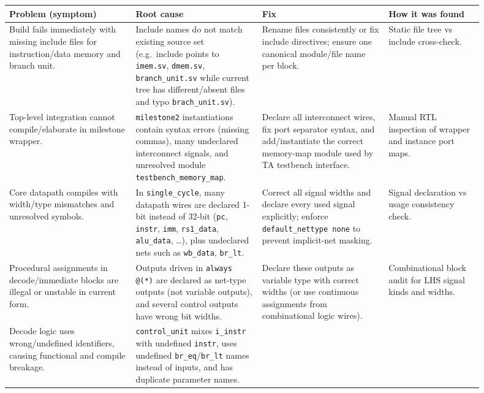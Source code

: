 \documentclass[10pt,a4paper]{article}
\begin{document}
\begin{center}
\small
\begin{tabular}{@{}p{0.24\linewidth}p{0.24\linewidth}p{0.24\linewidth}p{0.18\linewidth}@{}}
\toprule
\textbf{Problem (symptom)} & \textbf{Root cause} & \textbf{Fix} & \textbf{How it was found} \\
\midrule
Build fails immediately with missing include files for instruction/data memory and branch unit. &
Include names do not match existing source set (e.g.\ include points to \texttt{imem.sv}, \texttt{dmem.sv}, \texttt{branch\_unit.sv} while current tree has different/absent files and typo \texttt{brach\_unit.sv}). &
Rename files consistently or fix include directives; ensure one canonical module/file name per block. &
Static file tree vs include cross-check. \\
\addlinespace
Top-level integration cannot compile/elaborate in milestone wrapper. &
\texttt{milestone2} instantiations contain syntax errors (missing commas), many undeclared interconnect signals, and unresolved module \texttt{testbench\_memory\_map}. &
Declare all interconnect wires, fix port separator syntax, and add/instantiate the correct memory-map module used by TA testbench interface. &
Manual RTL inspection of wrapper and instance port maps. \\
\addlinespace
Core datapath compiles with width/type mismatches and unresolved symbols. &
In \texttt{single\_cycle}, many datapath wires are declared 1-bit instead of 32-bit (\texttt{pc}, \texttt{instr}, \texttt{imm}, \texttt{rs1\_data}, \texttt{alu\_data}, \dots), plus undeclared nets such as \texttt{wb\_data}, \texttt{br\_lt}. &
Correct all signal widths and declare every used signal explicitly; enforce \texttt{default\_nettype none} to prevent implicit-net masking. &
Signal declaration vs usage consistency check. \\
\addlinespace
Procedural assignments in decode/immediate blocks are illegal or unstable in current form. &
Outputs driven in \texttt{always @(*)} are declared as net-type outputs (not variable outputs), and several control outputs have wrong bit widths. &
Declare these outputs as variable type with correct widths (or use continuous assignments from combinational logic wires). &
Combinational block audit for LHS signal kinds and widths. \\
\addlinespace
Decode logic uses wrong/undefined identifiers, causing functional and compile breakage. &
\texttt{control\_unit} mixes \texttt{i\_instr} with undefined \texttt{instr}, uses undefined \texttt{br\_eq}/\texttt{br\_lt} names instead of inputs, and has duplicate parameter names. &

\end{tabular}
\end{center}
\end{document}
